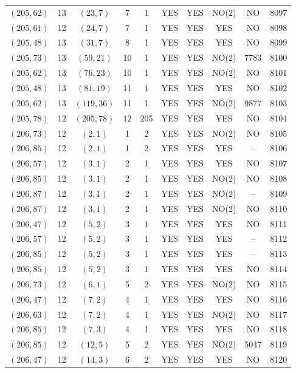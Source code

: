 \begin{longtable}{|c|c|c|c|c|c|c|c|c|c|}
$(205, 62)$ & 13 & $(23, 7)$ & 7 & 1 & YES & YES & NO(2) & NO & 8097\\
$(205, 61)$ & 12 & $(24, 7)$ & 7 & 1 & YES & YES & YES & NO & 8098\\
$(205, 48)$ & 13 & $(31, 7)$ & 8 & 1 & YES & YES & YES & NO & 8099\\
$(205, 73)$ & 13 & $(59, 21)$ & 10 & 1 & YES & YES & NO(2) & 7783 & 8100\\
$(205, 62)$ & 13 & $(76, 23)$ & 10 & 1 & YES & YES & NO(2) & NO & 8101\\
$(205, 48)$ & 13 & $(81, 19)$ & 11 & 1 & YES & YES & YES & NO & 8102\\
$(205, 62)$ & 13 & $(119, 36)$ & 11 & 1 & YES & YES & NO(2) & 9877 & 8103\\
$(205, 78)$ & 12 & $(205, 78)$ & 12 & 205 & YES & YES & YES & NO & 8104\\
$(206, 73)$ & 12 & $(2, 1)$ & 1 & 2 & YES & YES & NO(2) & NO & 8105\\
$(206, 85)$ & 12 & $(2, 1)$ & 1 & 2 & YES & YES & YES & -- & 8106\\
$(206, 57)$ & 12 & $(3, 1)$ & 2 & 1 & YES & YES & YES & NO & 8107\\
$(206, 85)$ & 12 & $(3, 1)$ & 2 & 1 & YES & YES & NO(2) & NO & 8108\\
$(206, 87)$ & 12 & $(3, 1)$ & 2 & 1 & YES & YES & NO(2) & -- & 8109\\
$(206, 87)$ & 12 & $(3, 1)$ & 2 & 1 & YES & YES & NO(2) & NO & 8110\\
$(206, 47)$ & 12 & $(5, 2)$ & 3 & 1 & YES & YES & YES & NO & 8111\\
$(206, 57)$ & 12 & $(5, 2)$ & 3 & 1 & YES & YES & YES & -- & 8112\\
$(206, 85)$ & 12 & $(5, 2)$ & 3 & 1 & YES & YES & YES & -- & 8113\\
$(206, 85)$ & 12 & $(5, 2)$ & 3 & 1 & YES & YES & YES & NO & 8114\\
$(206, 73)$ & 12 & $(6, 1)$ & 5 & 2 & YES & YES & NO(2) & NO & 8115\\
$(206, 47)$ & 12 & $(7, 2)$ & 4 & 1 & YES & YES & YES & NO & 8116\\
$(206, 63)$ & 12 & $(7, 2)$ & 4 & 1 & YES & YES & NO(2) & NO & 8117\\
$(206, 85)$ & 12 & $(7, 3)$ & 4 & 1 & YES & YES & YES & NO & 8118\\
$(206, 85)$ & 12 & $(12, 5)$ & 5 & 2 & YES & YES & NO(2) & 5047 & 8119\\
$(206, 47)$ & 12 & $(14, 3)$ & 6 & 2 & YES & YES & YES & NO & 8120\\

\end{longtable}
